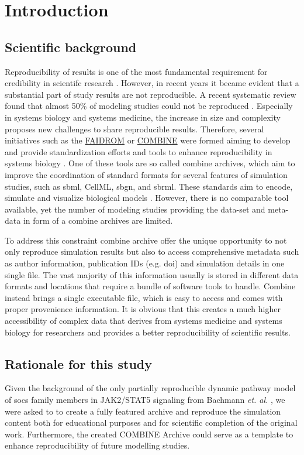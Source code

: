 \section*{Introduction}

\subsection*{Scientific background}
Reproducibility of results is one of the most fundamental requirement for credibility in scientifc research \cite{tiwari2021reproducibility}. However, in recent years it became evident that a substantial part of study results are not reproducible. A recent systematic review found that almost 50\% of modeling studies could not be reproduced \cite{tiwari2021reproducibility}. Especially in systems biology and systems medicine, the increase in size and complexity proposes new challenges to share reproducible results. Therefore, several initiatives such as the \hyperlink{https://fair-dom.org/}{FAIDROM} or \hyperlink{http://co.mbine.org/}{COMBINE} were formed aiming to develop and provide standardization efforts and tools to enhance reproducibility in systems biology \cite{specificationsb}. One of these tools are so called \ac{combine} archives, which aim to improve the coordination of standard formats for several features of simulation studies, such as \ac{sbml}, CellML, \ac{sbgn}, and \ac{sbrml}. These standards aim to encode, simulate and visualize biological models \cite{combine}. However, there is no comparable tool available, yet the number of modeling studies providing the data-set and meta-data in form of a \ac{combine} archives are limited. 

To address this constraint \ac{combine} archive offer the unique opportunity to not only reproduce simulation results but also to access comprehensive metadata such as author information, publication IDs (e.g. \ac{doi}) and simulation details in one single file. The vast majority of this information usually  is stored in different data formats and locations that require a bundle of software tools to handle. Combine instead brings a single executable file, which is easy to access and comes with proper provenience information. It is obvious that this creates a much higher accessibility of complex data that derives from systems medicine and systems biology for researchers and provides a better reproducibility of scientific results.

\subsection*{Rationale for this study}
Given the background of the only partially reproducible dynamic pathway model of \ac{socs} family members in JAK2/STAT5 signaling from Bachmann \textit{et. al.} \cite{bachmannmodel}, we  were asked to  to create a fully featured archive and reproduce the simulation content both for educational purposes and for scientific completion of the original work. Furthermore, the created COMBINE Archive could serve as a template to enhance reproducibility of future modelling studies.

